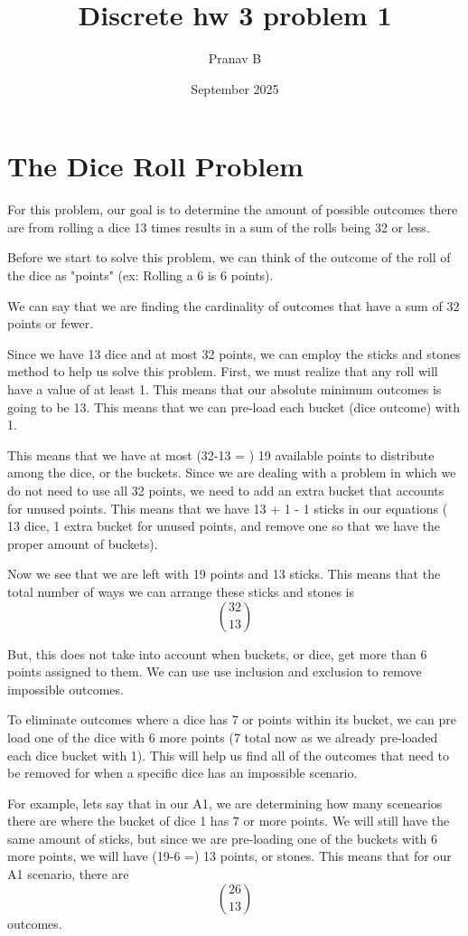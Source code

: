\documentclass{article}
\title{Discrete hw 3 problem 1}
\author{Pranav B}
\date{September 2025}
\begin{document}
\maketitle

\section{The Dice Roll Problem}

For this problem, our goal is to determine the amount of possible outcomes there are from rolling a dice 13 times results in a sum of the rolls being 32 or less. 

Before we start to solve this problem, we can think of the outcome of the roll of the dice as "points" (ex: Rolling a 6 is 6 points).

We can say that we are finding the cardinality of outcomes that have a sum of 32 points or fewer.

Since we have 13 dice and at most 32 points, we can employ the sticks and stones method to help us solve this problem. First, we must realize that any roll will have a value of at least 1. This means that our absolute minimum outcomes is going to be 13. This means that we can pre-load each bucket (dice outcome) with 1. 

This means that we have at most (32-13 = ) 19 available points to distribute among the dice, or the buckets. Since we are dealing with a problem in which we do not need to use all 32 points, we need to add an extra bucket that accounts for unused points. This means that we have 13 + 1 - 1 sticks in our equations ( 13 dice, 1 extra bucket for unused points, and remove one so that we have the proper amount of buckets).

Now we see that we are left with 19 points and 13 sticks. This means that the total number of ways we can arrange these sticks and stones is \[32 \choose 13\]

But, this does not take into account when buckets, or dice, get more than 6 points assigned to them. We can use use inclusion and exclusion to remove impossible outcomes. 

To eliminate outcomes where a dice has 7 or points within its bucket, we can pre load one of the dice with 6 more points (7 total now as we already pre-loaded each dice bucket with 1). This will help us find all of the outcomes that need to be removed for when a specific dice has an impossible scenario. 


For example, lets say that in our A1, we are determining how many  scenearios there are where the bucket of dice 1 has 7 or more points. We will still have the same amount of sticks, but since we are pre-loading one of the buckets with 6 more points, we will have (19-6 =) 13 points, or stones. This means that for our A1 scenario, there are \[26 \choose 13\] outcomes. 
\end{document}
